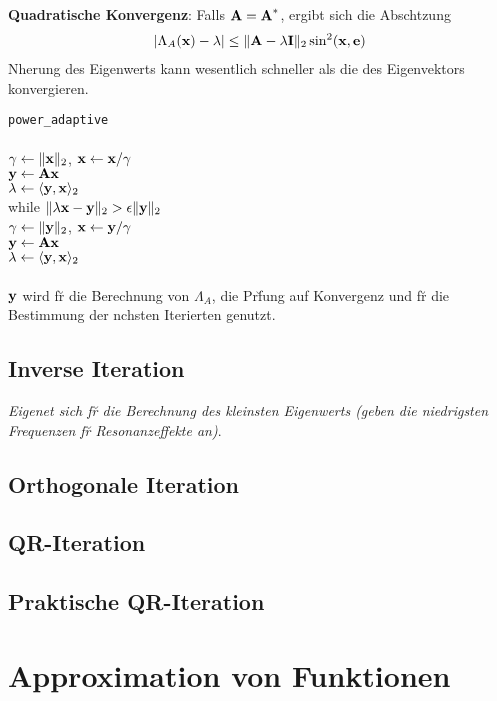 \textbf{Quadratische Konvergenz}: Falls $\mbox{\bf A}=\mbox{\bf A}^*$, ergibt sich die Absch\a tzung\begin{align*}
|\Lambda_A(\mbox{\bf x}) - \lambda| \leq \Vert \mbox{\bf A}- \lambda \mbox{\bf I} \Vert_2 \sin^2(\mbox{\bf x},\mbox{\bf e})
\end{align*}
N\a herung des Eigenwerts kann wesentlich schneller  als die des Eigenvektors konvergieren.\vspace{0.2cm}

\verb!power_adaptive!\\
{\addtolength{\leftskip}{0mm}
\hrulefill\\
$\gamma \leftarrow \Vert \mbox{\bf x} \Vert_2$, $\mbox{\bf x} \leftarrow \mbox{\bf x}/\gamma$ \\
$\mbox{\bf y} \leftarrow \mbox{\bf Ax}$\\
$\lambda \leftarrow \langle \mbox{\bf y},\mbox{\bf x} \rangle_2$\\
while $\Vert \lambda\mbox{\bf x} - \mbox{\bf y} \Vert_2 > \epsilon \Vert \mbox{\bf y} \Vert_2$ \\ 
\quad $\gamma \leftarrow \Vert \mbox{\bf y} \Vert_2$, $\mbox{\bf x} \leftarrow \mbox{\bf y}/\gamma$ \\
\quad $\mbox{\bf y} \leftarrow \mbox{\bf Ax}$\\
\quad $\lambda \leftarrow \langle \mbox{\bf y},\mbox{\bf x} \rangle_2$\\
\hrulefill\\
}
$\mbox{\bf y}$ wird f\u r die Berechnung von $\Lambda_A$, die Pr\u fung auf Konvergenz und f\u r die Bestimmung der n\a chsten Iterierten genutzt.

\subsection{Inverse Iteration}
\emph{Eigenet sich f\u r die Berechnung des kleinsten Eigenwerts (geben die niedrigsten Frequenzen f\u r Resonanzeffekte an)}.



\subsection{Orthogonale Iteration}
\subsection{QR-Iteration}
\subsection{Praktische QR-Iteration}

\section{Approximation von Funktionen}
